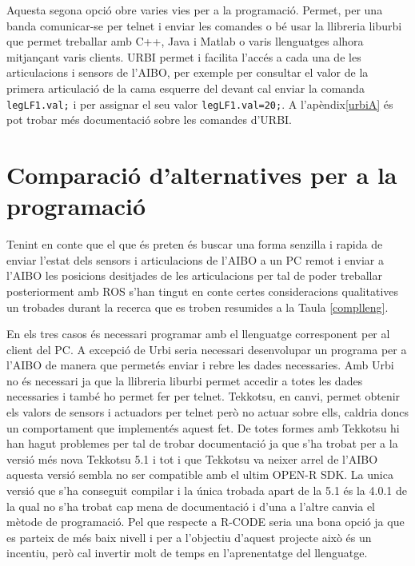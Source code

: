 \documentclass[12pt,a4paper,final,twoside]{article}
\begin{document}
Aquesta segona opció obre varies vies per a la programació. Permet, per una banda comunicar-se per telnet i enviar les comandes o bé usar la llibreria liburbi que permet treballar amb C++, Java i Matlab o varis llenguatges alhora mitjançant varis clients.
URBI permet i facilita l'accés a cada una de les articulacions i sensors de l'AIBO, per exemple per consultar el valor de la primera articulació de la cama esquerre del devant cal enviar la comanda \texttt{legLF1.val;} i per assignar el seu valor \texttt{legLF1.val=20;}\cite{urbicmd}. A l'apèndix\ref{urbiA} és pot trobar més documentació sobre les comandes d'URBI.

\clearpage
\section{Comparació d'alternatives per a la programació}

Tenint en conte que el que és preten és buscar una forma senzilla i rapida de enviar l'estat dels sensors i articulacions de l'AIBO a un PC remot i enviar a l'AIBO les posicions desitjades de les articulacions per tal de poder treballar posteriorment amb ROS s'han tingut en conte certes consideracions qualitatives un trobades durant la recerca que es troben resumides a la Taula \ref{complleng}.

En els tres casos és necessari programar amb el llenguatge corresponent per al client del PC. A excepció de Urbi seria necessari desenvolupar un programa per a l'AIBO de manera que permetés enviar i rebre les dades necessaries. Amb Urbi no és necessari ja que la llibreria liburbi permet accedir a totes les dades necessaries i també ho permet fer per telnet. Tekkotsu, en canvi, permet obtenir els valors de sensors i actuadors per telnet però no actuar sobre ells, caldria doncs un comportament que implementés aquest fet. De totes formes amb Tekkotsu hi han hagut problemes per tal de trobar documentació ja que s'ha trobat per a la versió més nova Tekkotsu 5.1 i tot i que Tekkotsu va neixer arrel de l'AIBO aquesta versió sembla no ser compatible amb el ultim OPEN-R SDK. La unica versió que s'ha conseguit compilar i la única trobada apart de la 5.1 és la 4.0.1 de la qual no s'ha trobat cap mena de documentació i d'una a l'altre canvia el mètode de programació.
Pel que respecte a R-CODE seria una bona opció ja que es parteix de més baix nivell i per a l'objectiu d'aquest projecte això és un incentiu, però cal invertir molt de temps en l'aprenentatge del llenguatge. 
\end{document}
